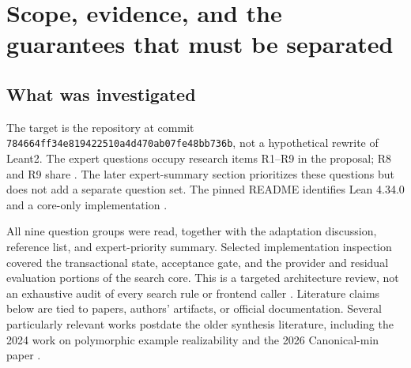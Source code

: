 \documentclass[11pt,a4paper]{article}
\theoremstyle{definition}
\theoremstyle{remark}
\newcommand{\code}[1]{\texttt{#1}}
\begin{document}
\begin{abstract}
The further-improvements proposal identifies the right bottlenecks, but several
of its research questions have more definite answers than the document suggests.
Smyth already supports higher-order function examples in its implementation;
Hoogle+ already incorporates type-class dictionaries; auxiliary-summary
invention has close precedents in AutoLifter; and Lean exposes reusable motive
construction. These findings substantially narrow, but do not eliminate, the
adaptation work.

The main recommendation is to develop Leant2 around three explicit objects:
a joint constraint state, a typed recursion or carrier sketch, and a certificate
of each decisive conclusion. This separates candidate correctness from safe
pruning, bounded coverage, ranking optimality, and reproducibility. We give
constructions for minimal finite sample-consistent carriers, prove a residual
state lower bound and a parametric shape--position representation theorem,
explain why reversing a list is already a fold into lists, and formulate
completion-stable residual evaluation. We also give concrete Lean integration
points, a dependency-aware proof schedule, a type-class-aware retrieval design,
and a regression and evaluation plan. Every expert question receives an
individual answer. General guarantees are explicitly restricted to their stated
fragments; empirical questions are not answered with invented measurements.
\end{abstract}

\tableofcontents
\newpage
\section{Scope, evidence, and the guarantees that must be separated}
\label{sec:scope}

\subsection{What was investigated}
The target is the repository at commit
\code{784664ff34e819422510a4d470ab07fe48bb736b}, not a hypothetical rewrite
of Leant2. The expert questions occupy research items R1--R9 in the proposal;
R8 and R9 share . The later expert-summary section
prioritizes these questions but does not add a separate question set.
The pinned README identifies Lean 4.34.0 and a core-only implementation
\cite{repo,proposal}.

All nine question groups were read, together with the adaptation discussion,
reference list, and expert-priority summary. Selected implementation inspection
covered the transactional state, acceptance gate, and the provider and residual
evaluation portions of the search core. This is a targeted architecture review,
not an exhaustive audit of every search rule or frontend caller
\cite{srcsearch,srcgate,srctrans}. Literature claims below are tied to papers,
authors' artifacts, or official documentation. Several particularly relevant
works postdate the older synthesis literature, including the 2024 work on
polymorphic example realizability and the 2026 Canonical-min paper
\cite{containers,canonicalmin}.
\end{document}
